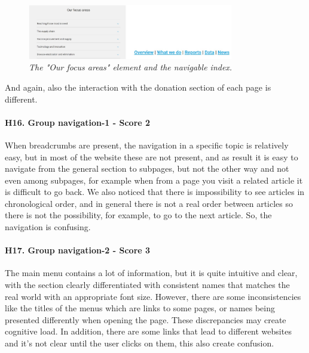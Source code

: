 \begin{figure}[!h]
	\begin{center}
		\includegraphics[width=0.8\textwidth]{FinalScores19.jpg}
		\captionsetup{font=small}
		\caption{\textit{The "Our focus areas" element and the navigable index.}}
	\end{center}
\end{figure}
\newline And again, also the interaction with the donation section of each page is different.
\newline
\newline \paragraph{H16. Group navigation-1 - Score 2}  \label{subsec:H16}	When breadcrumbs are present, the navigation in a specific topic is relatively easy, but in most of the website these are not present, and as result it is easy to navigate from the general section to subpages, but not the other way and not even among subpages, for example when from a page you visit a related article it is difficult to go back.
\newline We also noticed that there is impossibility to see articles in chronological order, and in general there is not a real order between articles so there is not the possibility, for example, to go to the next article.
\newline So, the navigation is confusing.
\newline
\newline \paragraph{H17. Group navigation-2 - Score 3}  \label{subsec:H17}	The main menu contains a lot of information, but it is quite intuitive and clear, with the section clearly differentiated with consistent names that matches the real world with an appropriate font size. However, there are some inconsistencies like the titles of the menus which are links to some pages, or names being presented differently when opening the page. These discrepancies may create cognitive load. 
\newline In addition, there are some links that lead to different websites and it’s not clear until the user clicks on them, this also create confusion.
